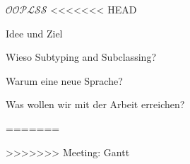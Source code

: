 \begin{frame}[t]{$\mathcal{OOPLSS}$}
<<<<<<< HEAD
  \begin{bigitemize}[<+->]{3mm}
		\item Idee und Ziel
		\item Wieso Subtyping and Subclassing?
		\item Warum eine neue Sprache?
		\item Was wollen wir mit der Arbeit erreichen?
	\end{bigitemize}
=======

>>>>>>> Meeting: Gantt
\end{frame}
